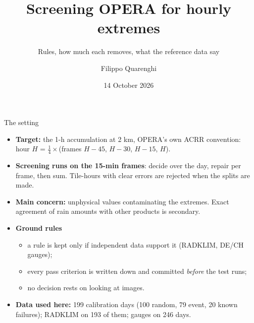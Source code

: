\documentclass[aspectratio=169,10pt]{beamer}
\title{Screening OPERA for hourly extremes}
\subtitle{Rules, how much each removes, what the reference data say}
\author{Filippo Quarenghi}
\date{14 October 2026}
\begin{document}
\begin{frame}
  \titlepage
\end{frame}

\begin{frame}{The setting}
  \begin{itemize}
    \item \textbf{Target:} the 1-h accumulation at 2 km, OPERA's own ACRR convention:
      hour $H$ = $\tfrac14\times$(frames $H{-}45$, $H{-}30$, $H{-}15$, $H$).
    \item \textbf{Screening runs on the 15-min frames}: decide over the day, repair per frame,
      then sum. Tile-hours with clear errors are rejected when the splits are made.
    \item \textbf{Main concern:} unphysical values contaminating the extremes. Exact agreement of
      rain amounts with other products is secondary.
    \item \textbf{Ground rules}
      \begin{itemize}
        \item a rule is kept only if independent data support it (RADKLIM, DE/CH gauges);
        \item every pass criterion is written down and committed \emph{before} the test runs;
        \item no decision rests on looking at images.
      \end{itemize}
    \item \textbf{Data used here:} 199 calibration days (100 random, 79 event, 20 known
      failures); RADKLIM on 193 of them; gauges on 246 days.
  \end{itemize}
\end{frame}
\end{document}
